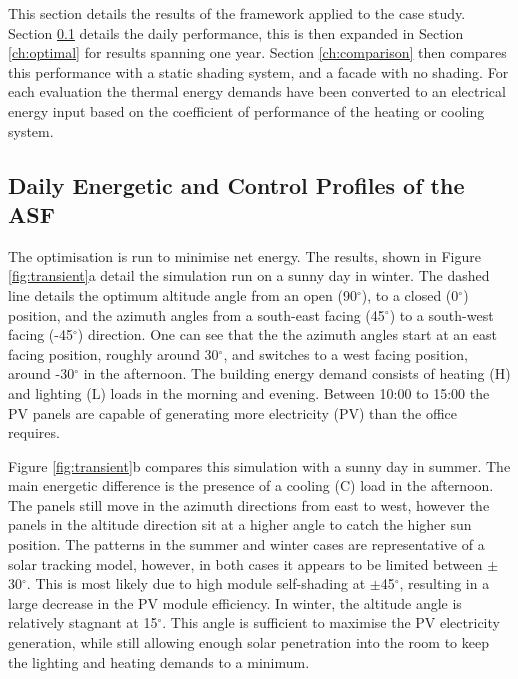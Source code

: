 


This section details the results of the framework applied to the case study. Section \ref{ch:transient} details the daily performance, this is then expanded in Section \ref{ch:optimal} for results spanning one year. Section \ref{ch:comparison} then compares this performance with a static shading system, and a facade with no shading. For each evaluation the thermal energy demands have been converted to an electrical energy input based on the coefficient of performance of the heating or cooling system.

\subsection{Daily Energetic and Control Profiles of the ASF}
\label{ch:transient}
The optimisation is run to minimise net energy. The results, shown in Figure \ref{fig:transient}a detail the simulation run on a sunny day in winter. The dashed line details the optimum altitude angle from an open (90$^{\circ}$), to a closed (0$^{\circ}$) position, and the azimuth angles from a south-east facing (45$^{\circ}$) to a south-west facing (-45$^{\circ}$) direction. One can see that the the azimuth angles start at an east facing position, roughly around 30$^{\circ}$, and switches to a west facing position, around -30$^{\circ}$ in the afternoon. The building energy demand consists of heating (H) and lighting (L) loads in the morning and evening. Between 10:00 to 15:00 the PV panels are capable of generating more electricity (PV) than the office requires. 

Figure \ref{fig:transient}b compares this simulation with a sunny day in summer. The main energetic difference is the presence of a cooling (C) load in the afternoon. The panels still move in the azimuth directions from east to west, however the panels in the altitude direction sit at a higher angle to catch the higher sun position. The patterns in the summer and winter cases are representative of a solar tracking model, however, in both cases it appears to be limited between $\pm$30$^{\circ}$. This is most likely due to high module self-shading at $\pm$45$^{\circ}$, resulting in a large decrease in the PV module efficiency. In winter, the altitude angle is relatively stagnant at 15$^{\circ}$. This angle is sufficient to maximise the PV electricity generation, while still allowing enough solar penetration into the room to keep the lighting and heating demands to a minimum. 

